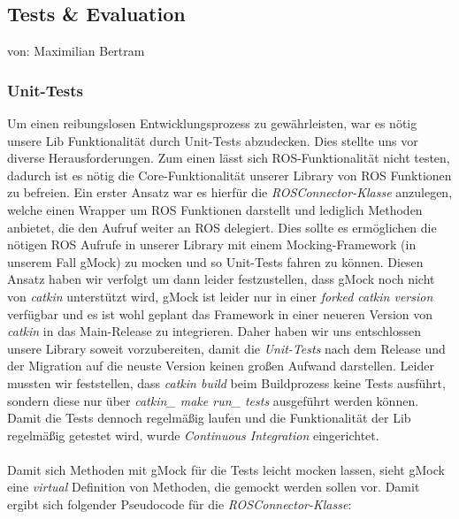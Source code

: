 \documentclass{suturo}
\makeatletter
\newcommand{\chapterauthor}[1]{%
  {\parindent0pt\vspace*{-27pt}%
  \linespread{0}\small\begin{flushright}von: #1\end{flushright}%
  \par\nobreak\vspace*{0pt}}
  \@afterheading%
}
\makeatother
\begin{document}
\begin{figure}[!htb]
\end{figure}

\newpage

\subsection{Tests \& Evaluation}
\chapterauthor{Maximilian Bertram}

\subsubsection{Unit-Tests}
Um einen reibungslosen Entwicklungsprozess zu gewährleisten, war es nötig unsere Lib Funktionalität durch Unit-Tests abzudecken. Dies stellte uns vor diverse Herausforderungen. Zum einen lässt sich ROS-Funktionalität nicht testen, dadurch ist es nötig die Core-Funktionalität unserer Library von ROS Funktionen zu befreien. Ein erster Ansatz war es hierfür die \textit{ROSConnector-Klasse} anzulegen, welche einen Wrapper um ROS Funktionen darstellt und lediglich Methoden anbietet, die den Aufruf weiter an ROS delegiert. Dies sollte es ermöglichen die nötigen ROS Aufrufe in unserer Library mit einem Mocking-Framework (in unserem Fall gMock) zu mocken und so Unit-Tests fahren zu können. Diesen Ansatz haben wir verfolgt um dann leider festzustellen, dass gMock noch nicht von \textit{catkin} unterstützt wird, gMock ist leider nur in einer \textit{forked catkin version} verfügbar und es ist wohl geplant das Framework in einer neueren Version von \textit{catkin} in das Main-Release zu integrieren. Daher haben wir uns entschlossen unsere Library soweit vorzubereiten, damit die \textit{Unit-Tests} nach dem Release und der Migration auf die neuste Version keinen großen Aufwand darstellen. Leider mussten wir feststellen, dass \textit{catkin build} beim Buildprozess keine Tests ausführt, sondern diese nur über \textit{catkin\_ make run\_ tests} ausgeführt werden können. Damit die Tests dennoch regelmäßig laufen und die Funktionalität der Lib regelmäßig getestet wird, wurde \textit{Continuous Integration} eingerichtet. 
\\ ~ \\
Damit sich Methoden mit gMock für die Tests leicht mocken lassen, sieht gMock eine \textit{virtual} Definition von Methoden, die gemockt werden sollen vor. Damit ergibt sich folgender Pseudocode für die \textit{ROSConnector-Klasse}: \\
\end{document}
